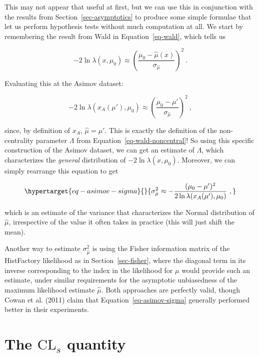 \documentclass[
  11pt,
  numbers=noendperiod]{book}
\begin{document}
This may not appear that useful at first, but we can use this in
conjunction with the results from Section~\ref{sec-asymptotics} to
produce some simple formulae that let us perform hypothesis tests
without much computation at all. We start by remembering the result from
Wald in Equation~\ref{eq-wald}, which tells us

\[
-2\ln \lambda(x,\mu_0) \approx \left(\frac{\mu_0 - \hat{\mu}(x)}{\sigma_{\hat{\mu}}}\right)^2 ~.
\]

Evaluating this at the Asimov dataset:

\[
-2\ln \lambda(x_A(\mu'),\mu_0) \approx \left(\frac{\mu_0 - \mu'}{\sigma_{\hat{\mu}}}\right)^2 ~,
\]

since, by definition of \(x_A\), \(\hat{\mu}=\mu'\). This is exactly the
definition of the non-centrality parameter \(\Lambda\) from
Equation~\ref{eq-wald-noncentral}! So using this specific construction
of the Asimov dataset, we can get an estimate of \(\Lambda\), which
characterizes the \emph{general} distribution of
\(-2\ln \lambda(x,\mu_0)\). Moreover, we can simply rearrange this
equation to get

\begin{equation}\protect\hypertarget{eq-asimov-sigma}{}{
\sigma^2_{\hat{\mu}} \approx - \frac{(\mu_0 - \mu')^2}{2\ln \lambda(x_A(\mu'),\mu_0)} ~,
}\label{eq-asimov-sigma}\end{equation}

which is an estimate of the variance that characterizes the Normal
distribution of \(\hat{\mu}\), irrespective of the value it often takes
in practice (this will just shift the mean).

Another way to estimate \(\sigma^2_{\hat{\mu}}\) is using the Fisher
information matrix of the HistFactory likelihood as in
Section~\ref{sec-fisher}, where the diagonal term in its inverse
corresponding to the index in the likelihood for \(\mu\) would provide
such an estimate, under similar requirements for the asymptotic
unbiasedness of the maximum likelihood estimate \(\hat{\mu}\). Both
approaches are perfectly valid, though Cowan et al. (2011) claim that
Equation~\ref{eq-asimov-sigma} generally performed better in their
experiments.

\hypertarget{the-textcl_s-quantity}{%
\section{\texorpdfstring{The \(\text{CL}_s\)
quantity}{The \textbackslash text\{CL\}\_s quantity}}\label{the-textcl_s-quantity}}
\end{document}
